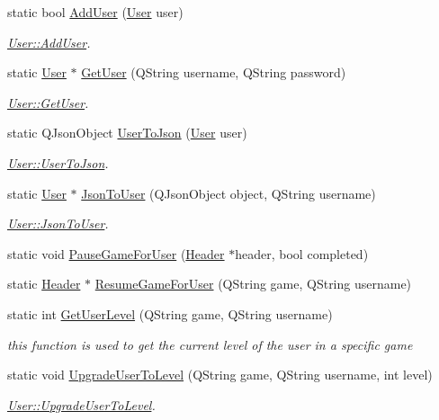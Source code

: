 \begin{DoxyCompactItemize}
\item 
static bool \hyperlink{classUser_aa80c06d9b3076301a3b36831ad8324dc}{Add\-User} (\hyperlink{classUser}{User} user)
\begin{DoxyCompactList}\small\item\em \hyperlink{classUser_aa80c06d9b3076301a3b36831ad8324dc}{User\-::\-Add\-User}. \end{DoxyCompactList}\item 
static \hyperlink{classUser}{User} $\ast$ \hyperlink{classUser_a79a561251d56226e81062affe8312a09}{Get\-User} (Q\-String username, Q\-String password)
\begin{DoxyCompactList}\small\item\em \hyperlink{classUser_a79a561251d56226e81062affe8312a09}{User\-::\-Get\-User}. \end{DoxyCompactList}\item 
static Q\-Json\-Object \hyperlink{classUser_aa4ecad468e06bde01b44b4b2fd1186a6}{User\-To\-Json} (\hyperlink{classUser}{User} user)
\begin{DoxyCompactList}\small\item\em \hyperlink{classUser_aa4ecad468e06bde01b44b4b2fd1186a6}{User\-::\-User\-To\-Json}. \end{DoxyCompactList}\item 
static \hyperlink{classUser}{User} $\ast$ \hyperlink{classUser_a672d3246cd8890263bc359af137e0f41}{Json\-To\-User} (Q\-Json\-Object object, Q\-String username)
\begin{DoxyCompactList}\small\item\em \hyperlink{classUser_a672d3246cd8890263bc359af137e0f41}{User\-::\-Json\-To\-User}. \end{DoxyCompactList}\item 
static void \hyperlink{classUser_af72d21ca380b5ec3697978a1cbd8bec1}{Pause\-Game\-For\-User} (\hyperlink{classHeader}{Header} $\ast$header, bool completed)
\item 
static \hyperlink{classHeader}{Header} $\ast$ \hyperlink{classUser_afc56ee5edbdbdb8c95d6d869e95c23f5}{Resume\-Game\-For\-User} (Q\-String game, Q\-String username)
\item 
\hypertarget{classUser_a2166948eb636ad50a7e613e422e08ad8}{static int \hyperlink{classUser_a2166948eb636ad50a7e613e422e08ad8}{Get\-User\-Level} (Q\-String game, Q\-String username)}\label{classUser_a2166948eb636ad50a7e613e422e08ad8}

\begin{DoxyCompactList}\small\item\em this function is used to get the current level of the user in a specific game \end{DoxyCompactList}\item 
static void \hyperlink{classUser_a90499a55331bf2e55ff274e0ffa143fe}{Upgrade\-User\-To\-Level} (Q\-String game, Q\-String username, int level)
\begin{DoxyCompactList}\small\item\em \hyperlink{classUser_a90499a55331bf2e55ff274e0ffa143fe}{User\-::\-Upgrade\-User\-To\-Level}. \end{DoxyCompactList}\end{DoxyCompactItemize}
